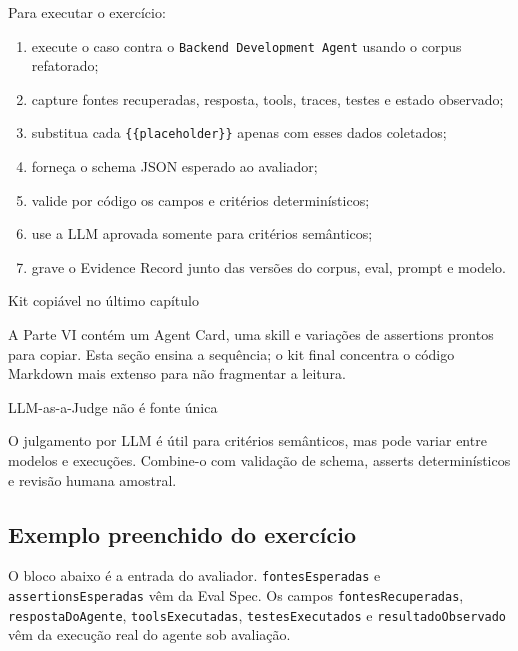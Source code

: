 \documentclass[
  10pt,
  a4paper,
  oneside]{book}
\providecommand{\tightlist}{%
  \setlength{\itemsep}{0pt}\setlength{\parskip}{0pt}}
\begin{document}
Para executar o exercício:

\begin{enumerate}
\def\labelenumi{\arabic{enumi}.}
\tightlist
\item
  execute o caso contra o \texttt{Backend\ Development\ Agent} usando o
  corpus refatorado;
\item
  capture fontes recuperadas, resposta, tools, traces, testes e estado
  observado;
\item
  substitua cada \texttt{\{\{placeholder\}\}} apenas com esses dados
  coletados;
\item
  forneça o schema JSON esperado ao avaliador;
\item
  valide por código os campos e critérios determinísticos;
\item
  use a LLM aprovada somente para critérios semânticos;
\item
  grave o Evidence Record junto das versões do corpus, eval, prompt e
  modelo.
\end{enumerate}

\begin{tipbox}{Kit copiável no último capítulo}

A Parte VI contém um Agent Card, uma skill e variações de assertions
prontos para copiar. Esta seção ensina a sequência; o kit final
concentra o código Markdown mais extenso para não fragmentar a leitura.

\end{tipbox}

\begin{warningbox}{LLM-as-a-Judge não é fonte única}

O julgamento por LLM é útil para critérios semânticos, mas pode variar
entre modelos e execuções. Combine-o com validação de schema, asserts
determinísticos e revisão humana amostral.

\end{warningbox}

\hypertarget{exemplo-preenchido-do-exercuxedcio}{%
\subsection{Exemplo preenchido do
exercício}\label{exemplo-preenchido-do-exercuxedcio}}

O bloco abaixo é a entrada do avaliador. \texttt{fontesEsperadas} e
\texttt{assertionsEsperadas} vêm da Eval Spec. Os campos
\texttt{fontesRecuperadas}, \texttt{respostaDoAgente},
\texttt{toolsExecutadas}, \texttt{testesExecutados} e
\texttt{resultadoObservado} vêm da execução real do agente sob
avaliação.
\end{document}
